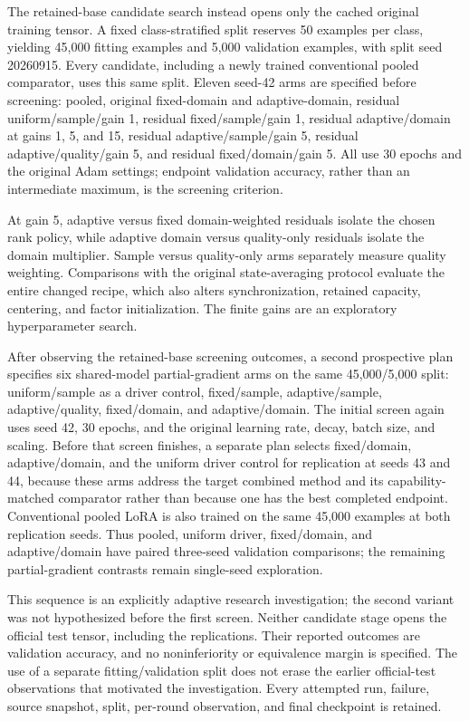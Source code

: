 \documentclass[11pt]{article}
\begin{document}
The retained-base candidate search instead opens only the cached original training tensor. A fixed class-stratified split reserves 50 examples per class, yielding 45,000 fitting examples and 5,000 validation examples, with split seed 20260915. Every candidate, including a newly trained conventional pooled comparator, uses this same split. Eleven seed-42 arms are specified before screening: pooled, original fixed-domain and adaptive-domain, residual uniform/sample/gain 1, residual fixed/sample/gain 1, residual adaptive/domain at gains 1, 5, and 15, residual adaptive/sample/gain 5, residual adaptive/quality/gain 5, and residual fixed/domain/gain 5. All use 30 epochs and the original Adam settings; endpoint validation accuracy, rather than an intermediate maximum, is the screening criterion.

At gain 5, adaptive versus fixed domain-weighted residuals isolate the chosen rank policy, while adaptive domain versus quality-only residuals isolate the domain multiplier. Sample versus quality-only arms separately measure quality weighting. Comparisons with the original state-averaging protocol evaluate the entire changed recipe, which also alters synchronization, retained capacity, centering, and factor initialization. The finite gains are an exploratory hyperparameter search.

After observing the retained-base screening outcomes, a second prospective plan specifies six shared-model partial-gradient arms on the same 45,000/5,000 split: uniform/sample as a driver control, fixed/sample, adaptive/sample, adaptive/quality, fixed/domain, and adaptive/domain. The initial screen again uses seed 42, 30 epochs, and the original learning rate, decay, batch size, and scaling. Before that screen finishes, a separate plan selects fixed/domain, adaptive/domain, and the uniform driver control for replication at seeds 43 and 44, because these arms address the target combined method and its capability-matched comparator rather than because one has the best completed endpoint. Conventional pooled LoRA is also trained on the same 45,000 examples at both replication seeds. Thus pooled, uniform driver, fixed/domain, and adaptive/domain have paired three-seed validation comparisons; the remaining partial-gradient contrasts remain single-seed exploration.

This sequence is an explicitly adaptive research investigation; the second variant was not hypothesized before the first screen. Neither candidate stage opens the official test tensor, including the replications. Their reported outcomes are validation accuracy, and no noninferiority or equivalence margin is specified. The use of a separate fitting/validation split does not erase the earlier official-test observations that motivated the investigation. Every attempted run, failure, source snapshot, split, per-round observation, and final checkpoint is retained.
\end{document}
